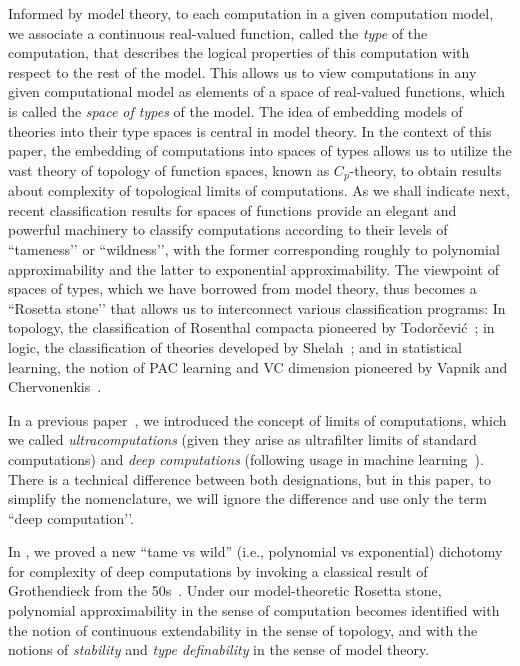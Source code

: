 \documentclass[psamsfonts]{amsart}
\theoremstyle{definition}
\theoremstyle{remark}
\numberwithin{equation}{section}
\begin{document}
Informed by model theory, to each computation in a given computation model, we associate a continuous real-valued function, called the \emph{type} of the computation, that describes the logical properties of this computation with respect to the rest of the model.
This allows us to view computations in any given computational model  as elements of a space of real-valued functions, which is called the \emph{space of types} of the model.
The idea of embedding models of theories into their type spaces is central in model theory.
In the context of this paper, the embedding of computations into spaces of types allows us to utilize the vast theory of topology of function spaces, known as $C_p$-theory, to obtain results about complexity of topological limits of computations.
As we shall indicate next, recent classification results for spaces of functions provide an elegant and powerful machinery to classify computations according to their levels of ``tameness’’ or ``wildness’’, with the former corresponding roughly to polynomial approximability and the latter to exponential approximability.
The viewpoint of spaces of types, which we have borrowed from model theory, thus becomes a ``Rosetta stone’’  that allows us  to interconnect various classification programs: In topology, the classification of Rosenthal compacta pioneered by Todorčević~\cite{Todorcevic_1999_CompactSubsetsBaire}; in logic, the classification of theories developed by Shelah~\cite{Shelah:1990}; and in statistical learning, the notion of PAC learning and VC dimension pioneered by Vapnik and Chervonenkis~\cite{Vapnik-Chervonenkis:1974, Vapnik-Chervonenkis:1971}.



In a previous paper~\cite{alva2024approximability}, we introduced the concept of limits of computations, which we called \emph{ultracomputations} (given they arise as ultrafilter limits of standard computations) and \emph{deep computations}  (following usage in machine learning~\cite{Bai:2019}).
There is a technical difference between both designations, but in this paper, to simplify the nomenclature, we will ignore the difference and use only the term ``deep computation’’.

In \cite{alva2024approximability}, we proved a new ``tame vs wild'' (i.e., polynomial vs exponential) dichotomy for complexity of deep computations by invoking a classical result of Grothendieck from the 50s~\cite{Grothendieck:1952}.
Under our model-theoretic Rosetta stone, polynomial approximability in the sense of computation becomes identified with the notion of continuous extendability in the sense of topology, and with the notions of \emph{stability} and \emph{type definability} in the sense of model theory.
\end{document}
